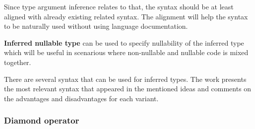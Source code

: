 Since type argument inference relates to that, the syntax should be at least aligned with already existing related syntax. 
The alignment will help the syntax to be naturally used without using language documentation.
\par
\textbf{Inferred nullable type} can be used to specify nullability of the inferred type which will be useful in scenarious where non-nullable and nullable code is mixed together.
\par
There are several syntax that can be used for inferred types. 
The work presents the most relevant syntax that appeared in the mentioned ideas and comments on the advantages and disadvantages for each variant.

\subsubsection{Diamond operator} 

